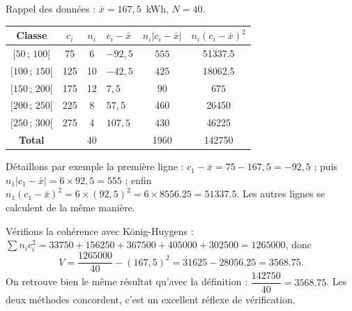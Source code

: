 \documentclass[11pt]{article}
\begin{document}
\begin{exemplebox}
Rappel des données : $\bar{x} = 167{,}5$~kWh, $N = 40$.
\begin{center}
\begin{tabularx}{\linewidth}{|c|c|c|X|c|c|}
\hline
\rowcolor{popblueL} Classe & $c_i$ & $n_i$ & \centering $c_i - \bar{x}$ & $n_i|c_i-\bar{x}|$ & $n_i(c_i-\bar{x})^2$ \\
\hline
$[50\,;\,100[$ & 75 & 6 & $-92{,}5$ & $555$ & \num{51337,5} \\
\hline
$[100\,;\,150[$ & 125 & 10 & $-42{,}5$ & $425$ & \num{18062,5} \\
\hline
$[150\,;\,200[$ & 175 & 12 & $7{,}5$ & $90$ & $675$ \\
\hline
$[200\,;\,250[$ & 225 & 8 & $57{,}5$ & $460$ & \num{26450} \\
\hline
$[250\,;\,300[$ & 275 & 4 & $107{,}5$ & $430$ & \num{46225} \\
\hline
\rowcolor{popgoldL} \textbf{Total} & & $40$ & & \num{1960} & \num{142750} \\
\hline
\end{tabularx}
\end{center}
Détaillons par exemple la première ligne : $c_1 - \bar{x} = 75 - 167{,}5 = -92{,}5$ ; puis $n_1|c_1 - \bar{x}| = 6 \times 92{,}5 = 555$ ; enfin $n_1(c_1-\bar{x})^2 = 6 \times (92{,}5)^2 = 6 \times \num{8556,25} = \num{51337,5}$. Les autres lignes se calculent de la même manière.

Vérifions la cohérence avec König-Huygens : $\sum n_i c_i^2 = \num{33750} + \num{156250} + \num{367500} + \num{405000} + \num{302500} = \num{1265000}$, donc
\[ V = \frac{\num{1265000}}{40} - (167{,}5)^2 = \num{31625} - \num{28056,25} = \num{3568,75}. \]
On retrouve bien le même résultat qu'avec la définition : $\dfrac{\num{142750}}{40} = \num{3568,75}$. Les deux méthodes concordent, c'est un excellent réflexe de vérification.
\end{exemplebox}
\end{document}
